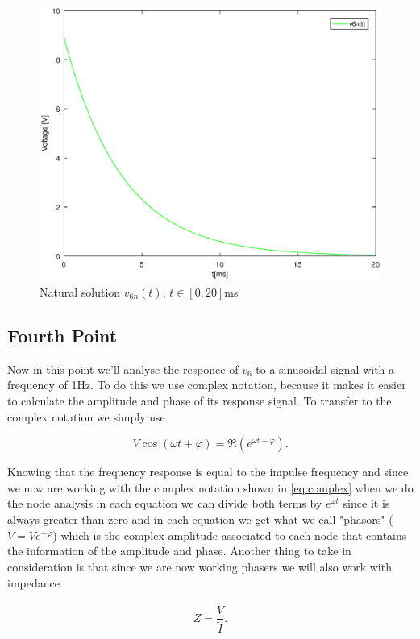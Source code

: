 \begin{figure}[h] \centering
\includegraphics[width=0.7\linewidth]{naturalsolution.eps}
\caption{Natural solution $v_{6n}(t)$, $t\in[0,20]$ms}
\label{fig:snat}
\end{figure}

\subsection{Fourth Point}
\label{ssec:4T}

\par Now in this point we'll analyse the responce of $v_6$ to a sinusoidal signal with a frequency of 1Hz. To do this we use complex notation, because it makes it easier to calculate the amplitude and phase of its response signal. To transfer to the complex notation we simply use 

\begin{equation}
  V\cos(\omega t + \varphi) = \Re (e^{\omega t - \varphi}).
  \label{eq:complex}
\end{equation}

\par Knowing that the frequency response is equal to the impulse frequency and since we now are working with the complex notation shown in \ref{eq:complex} when we do the node analysis in each equation we can divide both terms by $e^{\omega t}$ since it is always greater than zero and in each equation we get what we call "phasors" ($\widetilde{V}=V e^{-\varphi}$) which is the complex amplitude associated to each node that contains the information of the amplitude and phase. Another thing to take in consideration is that since we are now working phasers we will also work with impedance

\begin{equation}
  Z = \frac{\widetilde{V}}{\widetilde{I}}.
  \label{eq:impedance}
\end{equation}

